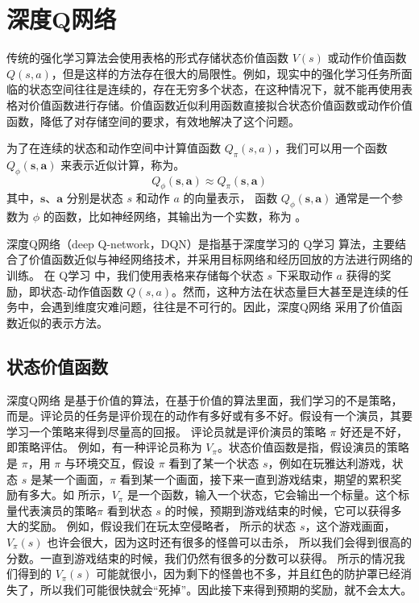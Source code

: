 \section{深度Q网络} 
传统的强化学习算法会使用表格的形式存储状态价值函数 $V(s)$ 或动作价值函数 $Q(s,a)$，但是这样的方法存在很大的局限性。例如，现实中的强化学习任务所面临的状态空间往往是连续的，存在无穷多个状态，在这种情况下，就不能再使用表格对价值函数进行存储。价值函数近似利用函数直接拟合状态价值函数或动作价值函数，降低了对存储空间的要求，有效地解决了这个问题。

为了在连续的状态和动作空间中计算值函数 $Q_{\pi}(s,a)$，我们可以用一个函数 $Q_{\phi}(\boldsymbol{s},\boldsymbol{a})$ 来表示近似计算，称为。
\begin{equation}
    Q_{\phi}(\boldsymbol{s}, \boldsymbol{a}) \approx Q_{\pi}(\boldsymbol{s}, \boldsymbol{a})
    \label{eq:}
\end{equation}
其中，$\boldsymbol{s}$、$\boldsymbol{a}$ 分别是状态 $s$ 和动作 $a$ 的向量表示，
函数 $Q_{\phi}(\boldsymbol{s}, \boldsymbol{a})$ 通常是一个参数为 $\phi$ 的函数，比如神经网络，其输出为一个实数，称为 。

深度Q网络（deep Q-network，DQN）是指基于深度学习的 Q学习 算法，主要结合了价值函数近似与神经网络技术，并采用目标网络和经历回放的方法进行网络的训练。
在 Q学习 中，我们使用表格来存储每个状态 $s$ 下采取动作 $a$ 获得的奖励，即状态-动作值函数 $Q(s,a)$。然而，这种方法在状态量巨大甚至是连续的任务中，会遇到维度灾难问题，往往是不可行的。因此，深度Q网络 采用了价值函数近似的表示方法。

\subsection{状态价值函数} 

深度Q网络 是基于价值的算法，在基于价值的算法里面，我们学习的不是策略，而是。评论员的任务是评价现在的动作有多好或有多不好。假设有一个演员，其要学习一个策略来得到尽量高的回报。
评论员就是评价演员的策略 $\pi$  好还是不好，即策略评估。
例如，有一种评论员称为 $V_{\pi}$。状态价值函数是指，假设演员的策略是 $\pi$，用 $\pi$  与环境交互，假设 $\pi$  看到了某一个状态 $s$，例如在玩雅达利游戏，状态 $s$ 是某一个画面，$\pi$ 看到某一个画面，接下来一直到游戏结束，期望的累积奖励有多大。如 所示，$V_{\pi}$ 是一个函数，输入一个状态，它会输出一个标量。这个标量代表演员的策略$\pi$ 看到状态 $s$ 的时候，预期到游戏结束的时候，它可以获得多大的奖励。
例如，假设我们在玩太空侵略者，
 所示的状态 $s$，这个游戏画面，$V_{\pi}(s)$  也许会很大，因为这时还有很多的怪兽可以击杀， 所以我们会得到很高的分数。一直到游戏结束的时候，我们仍然有很多的分数可以获得。
 所示的情况我们得到的 $V_{\pi}(s)$ 可能就很小，因为剩下的怪兽也不多，并且红色的防护罩已经消失了，所以我们可能很快就会“死掉”。因此接下来得到预期的奖励，就不会太大。

